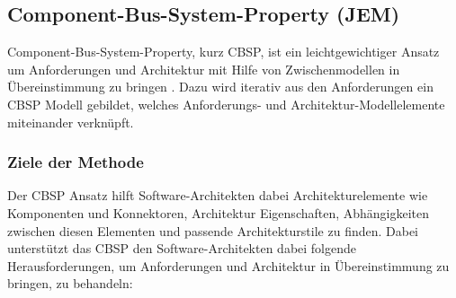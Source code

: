 \subsection{Component-Bus-System-Property (JEM)}\label{cbsp}

Component-Bus-System-Property, kurz CBSP, ist ein leichtgewichtiger Ansatz um Anforderungen und Architektur mit Hilfe von Zwischenmodellen in Übereinstimmung zu bringen \cite{Gru01}. Dazu wird iterativ aus den Anforderungen ein CBSP Modell gebildet, welches Anforderungs- und Architektur-Modellelemente miteinander verknüpft. \\

\subsubsection{Ziele der Methode}

Der CBSP Ansatz hilft Software-Architekten dabei Architekturelemente wie Komponenten und Konnektoren, Architektur Eigenschaften, Abhängigkeiten zwischen diesen Elementen und passende Architekturstile zu finden. Dabei unterstützt das CBSP den Software-Architekten dabei folgende Herausforderungen, um Anforderungen und Architektur in Übereinstimmung zu bringen, zu behandeln: \\

